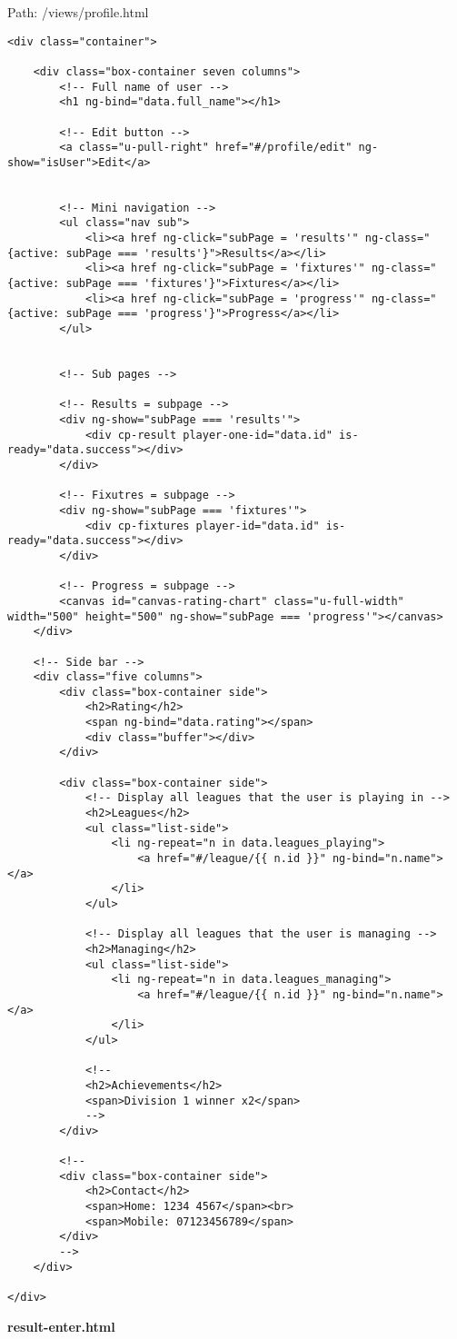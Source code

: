 Path: /views/profile.html
{\scriptsize
\begin{lstlisting}
<div class="container">

	<div class="box-container seven columns">
		<!-- Full name of user -->
		<h1 ng-bind="data.full_name"></h1>

		<!-- Edit button -->
		<a class="u-pull-right" href="#/profile/edit" ng-show="isUser">Edit</a>


		<!-- Mini navigation -->
		<ul class="nav sub">
			<li><a href ng-click="subPage = 'results'" ng-class="{active: subPage === 'results'}">Results</a></li>
			<li><a href ng-click="subPage = 'fixtures'" ng-class="{active: subPage === 'fixtures'}">Fixtures</a></li>
			<li><a href ng-click="subPage = 'progress'" ng-class="{active: subPage === 'progress'}">Progress</a></li>
		</ul>


		<!-- Sub pages -->

		<!-- Results = subpage -->
		<div ng-show="subPage === 'results'">
			<div cp-result player-one-id="data.id" is-ready="data.success"></div>
		</div>

		<!-- Fixutres = subpage -->
		<div ng-show="subPage === 'fixtures'">
			<div cp-fixtures player-id="data.id" is-ready="data.success"></div>
		</div>

		<!-- Progress = subpage -->
		<canvas id="canvas-rating-chart" class="u-full-width" width="500" height="500" ng-show="subPage === 'progress'"></canvas>
	</div>

	<!-- Side bar -->
	<div class="five columns">
		<div class="box-container side">
			<h2>Rating</h2>
			<span ng-bind="data.rating"></span>
			<div class="buffer"></div>
		</div>

		<div class="box-container side">
			<!-- Display all leagues that the user is playing in -->
			<h2>Leagues</h2>
			<ul class="list-side">
				<li ng-repeat="n in data.leagues_playing">
					<a href="#/league/{{ n.id }}" ng-bind="n.name"></a>
				</li>
			</ul>

			<!-- Display all leagues that the user is managing -->
			<h2>Managing</h2>
			<ul class="list-side">
				<li ng-repeat="n in data.leagues_managing">
					<a href="#/league/{{ n.id }}" ng-bind="n.name"></a>
				</li>
			</ul>

			<!--
			<h2>Achievements</h2>
			<span>Division 1 winner x2</span>
			-->
		</div>

		<!--
		<div class="box-container side">
			<h2>Contact</h2>
			<span>Home: 1234 4567</span><br>
			<span>Mobile: 07123456789</span>
		</div>
		-->
	</div>

</div>\end{lstlisting}
}
\textbf{result-enter.html}

